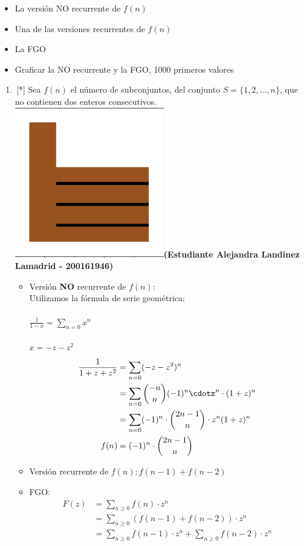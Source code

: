 \begin{itemize}
    \item La versión NO recurrente de $f(n)$ 
    \item Una de las versiones recurrentes de $f(n)$ 
    \item La FGO
    \item Graficar la NO recurrente y la FGO, 1000 primeros valores
\end{itemize}
\begin{enumerate}
     \item\,[*] Sea $f(n)$ el número de subconjuntos, del conjunto $S=\{1, 2,...,n\}$, que no contienen dos enteros consecutivos.
     \\
     \includegraphics[width= 10 mm]{figures/exc.png}\textbf{(Estudiante Alejandra Landinez Lamadrid - 200161946)}
     \begin{itemize}
         \item Versión \textbf{NO} recurrente de $f(n)$: 
         \\
         Utilizamos la fórmula de serie geométrica:\\ 
         \\
         $\frac{1}{1-x} = \sum_{n=0} x^n$\\
         \\
         $x = -z-z^2$\\
         \begin{align*}
             \frac{1}{1+z+z^2} &= \sum_{n=0} (-z-z^2)^n\\
             &= \sum_{n=0} \binom{-n}{n}(-1)^n\cdotz^n\cdot(1+z)^n\\
             &= \sum_{n=0} (-1)^n\cdot \binom{2n-1}{n}\cdot z^n (1+z)^n\\
             f(n) &= (-1)^n \cdot \binom{2n-1}{n}
         \end{align*}
         \item Versión recurrente de $f(n): f(n-1)+f(n-2)$
         \\
         \item FGO:
         \\
         \begin{align*} 
         F(z) &=\sum_{n\geq0} f(n)\cdot z^n\\
         &=\sum_{n\geq0} (f(n-1)+f(n-2))\cdot z^n\\
         &=\sum_{n\geq0} f(n-1)\cdot z^n + \sum_{n\geq0} f(n-2)\cdot z^n\\

\end{align*}
\end{itemize}
\end{enumerate}
